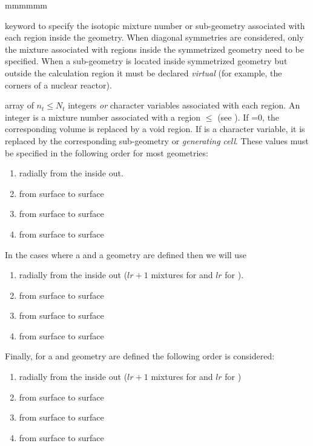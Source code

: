 \begin{ListeDeDescription}{mmmmmm}

\item[\moc{MIX}] keyword to specify the isotopic mixture number or
sub-geometry associated
with each region inside the geometry. When diagonal symmetries are considered,
only the mixture associated with regions inside the symmetrized geometry need to
be specified. When a sub-geometry is located inside symmetrized geometry but
outside the calculation region it must be declared {\sl virtual} (for example,
the corners of a nuclear reactor). 

\item[\dusa{imix}] array of $n_{t}\le N_t$ integers {\sl or} character variables associated
with each region. An integer is a mixture number associated with a region
$\le$ (see ). If
=0, the corresponding volume is replaced by a void region. If
 is a character variable, it is replaced by the corresponding
sub-geometry or {\sl generating cell}. These values must be specified in
the following order for most geometries: 

\begin{enumerate}
\item radially from the inside out. 
\item from surface  to surface 
\item from surface  to surface 
\item from surface  to surface 
\end{enumerate}

In the cases where a  and a  geometry are defined then we will use 

\begin{enumerate}
\item radially from the inside out ($lr+1$ mixtures for  and $lr$ for ). 
\item from surface  to surface 
\item from surface  to surface 
\item from surface  to surface 
\end{enumerate}

Finally, for a  and  geometry are defined the following order is considered:

\begin{enumerate}
\item radially from the inside out ($lr+1$ mixtures for  and $lr$ for ) 
\item from surface  to surface 
\item from surface  to surface 
\item from surface  to surface 
\end{enumerate}


\end{ListeDeDescription}
